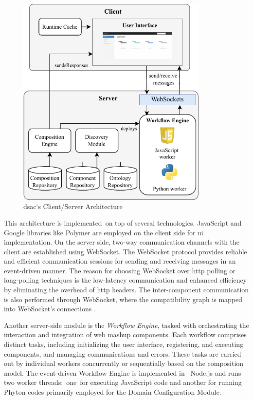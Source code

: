 \begin{figure}[hbt]
\hypertarget{fig:composition-arch}{%
\centering
\includegraphics[width=0.85\textwidth]{../figures/MyFigures/Client_server.drawio.pdf}
\captionsetup{justification=centering}
\caption{\gls{dsac}‘s Client/Server Architecture}\label{fig:composition-arch}
}
\end{figure}
This architecture is implemented~on top of several technologies.
JavaScript and Google libraries like Polymer are employed on the client
side for \gls{ui} implementation. On the server side, two-way communication
channels with the client are established using WebSocket. The WebSocket
protocol provides reliable and efficient communication sessions for
sending and receiving messages in an event-driven manner. The reason for
choosing WebSocket over \gls{http} polling or long-polling techniques is the
low-latency communication and enhanced efficiency by eliminating the
overhead of \gls{http} headers. The inter-component communication is also
performed through WebSocket, where the compatibility graph is mapped
into WebSocket's connections \autocite{Kotevski2011}.

Another server-side module is the \emph{Workflow Engine}, tasked with
orchestrating the interaction and integration of web mashup components.
Each workflow comprises distinct tasks, including initializing the user
interface, registering, and executing components, and managing
communications and errors. These tasks are carried out by individual
workers concurrently or sequentially based on the composition model. The
event-driven Workflow Engine is implemented in ~Node.js and runs two
worker threads:~one~for executing JavaScript code and another for
running Phyton codes primarily employed for the Domain Configuration
Module.

